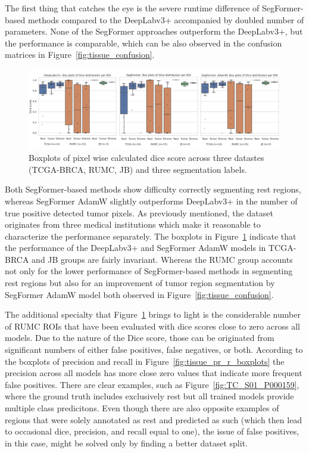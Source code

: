 The first thing that catches the eye is the severe runtime difference of
SegFormer-based methods compared to the DeepLabv3+ accompanied by doubled number of parameters.
None of the SegFormer approaches outperform the DeepLabv3+, but the performance
is comparable, which can be also observed in the confusion matrices in Figure~\ref*{fig:tissue_confusion}.

\begin{figure}[H]
    \includegraphics[width=\linewidth]{figures/tissue/dices.png}
    \caption{Boxplots of pixel wise calculated dice score across three datastes (TCGA-BRCA, RUMC, JB) and three segmentation labels.}
    \label{fig:tissue_dice_boxplots}
\end{figure} 

Both SegFormer-based methods show difficulty correctly segmenting rest regions, whereas
SegFormer AdamW slightly outperforms DeepLabv3+ in the number of true positive detected tumor pixels.
As previously mentioned, the dataset originates from three medical
institutions which make it reasonable to characterize the performance separately.
The boxplots in Figure~\ref*{fig:tissue_dice_boxplots} indicate that the performance of
the DeepLabv3+ and SegFormer AdamW models in TCGA-BRCA and JB groups are fairly invariant.
Whereas the RUMC group accounts not only for the lower performance of SegFormer-based methods
in segmenting rest regions but also for an improvement of tumor region segmentation by SegFormer AdamW
model both observed in Figure~\ref*{fig:tissue_confusion}.

The additional specialty that Figure~\ref*{fig:tissue_dice_boxplots} brings to light is
the considerable number of RUMC ROIs that have been evaluated with dice scores close to
zero across all models. Due to the nature of the Dice score, those can be originated from
significant numbers of either false positives, false negatives, or both.
According to the boxplots of precision and recall in Figure~\ref*{fig:tissue_pr_r_boxplots}
the precision across all models has more close zero values that indicate more frequent
false positives. There are clear examples, such as Figure~\ref*{fig:TC_S01_P000159},
where the ground truth includes exclusively rest but all trained models provide multiple class predicitons.
Even though there are also opposite examples of regions that were solely annotated as rest and predicted as
such (which then lead to occasional dice, precision, and recall equal to one),
the issue of false positives, in this case, might be solved only by finding a
better dataset split. 

